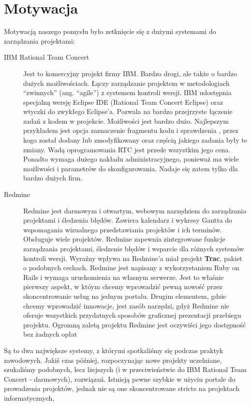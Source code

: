\documentclass[a4paper,12pt,notitlepage]{mwrep}
\begin{document}
\section{Motywacja}
Motywacją naszego pomysłu było zetknięcie się z dużymi systemami do zarządzania projektami:
\begin{description}
	\item[IBM Rational Team Concert]
		Jest to komercyjny projekt firmy IBM. Bardzo drogi,
		ale także o bardzo dużych możliwościach.
		Łączy zarządzanie projektem w metodologiach “zwinnych” (ang. “agile”)
		z systemem kontroli wersji. IBM udostępnia specjalną wersję
		Eclipse IDE (Rational Team Concert Eclipse) oraz wtyczki do zwykłego Eclipse’a.
		Pozwala na bardzo przejrzyste łączenie zadań z kodem w projekcie.
		Możliwości jest bardzo dużo. Najlepszym przykładem jest opcja zaznaczenie
		fragmentu kodu i sprawdzenia , przez kogo został dodany lub zmodyfikowany
		oraz częścią jakiego zadania były te zmiany. Wadą oprogramowania RTC jest
		przede wszystkim jego cena. Ponadto wymaga dużego nakładu administracyjnego,
		ponieważ ma wiele możliwości i parametrów do skonfigurowania.
		Nadaje się zatem tylko dla bardzo dużych firm. 
	\item[Redmine]
		Redmine jest darmowym i otwartym, webowym narzędziem do zarządzania projektami
		i śledzenia błędów. Zawiera kalendarz i wykresy Gantta do wspomagania wizualnego
		przedstawiania projektów i ich terminów. Obsługuje wiele projektów.
		Redmine zapewnia zintegrowane funkcje zarządzania projektami, śledzenie błędów
		i wsparcie dla różnych systemów kontroli wersji. Wyraźny wpływa na Redmine’a
		miał projekt \textbf{Trac}, pakiet o podobnych cechach. Redmine jest napisany
		z wykorzystaniem Ruby on Rails i wymaga uruchomienia na własnym serwerze.
		Jest to właśnie pierwszy aspekt, w któym chcemy wprowadzić pewną nowość
		przez skoncentrowanie usług na jednym portalu. Drugim elementem, gdzie
		chcemy wprowadzić innowacje, jest zasób narzędzi, gdyż Redmine nie oferuje
		wszystkich przydatnych sposobów graficznej prezentacji przebiegu projektu.
		Ogromną zaletą projektu Redmine jest oczywiści jego dostępność bez żadnych opłat
\end{description}
Są to dwa największe systemy, z którymi spotkaliśmy się podczas praktyk zawodowych.
Jakiś czas później, rozpoczynając nowe projekty uczelniane, szukaliśmy podobnych,
lecz lżejszych (i w przeciwieństwie do IBM Rational Team Concert - darmowych),
rozwiązań. Istnieją pewne szybkie w użyciu portale do prowadzenia projektów,
jednak nie są one skoncentrowane stricte na projektach informatycznych,
\end{document}
